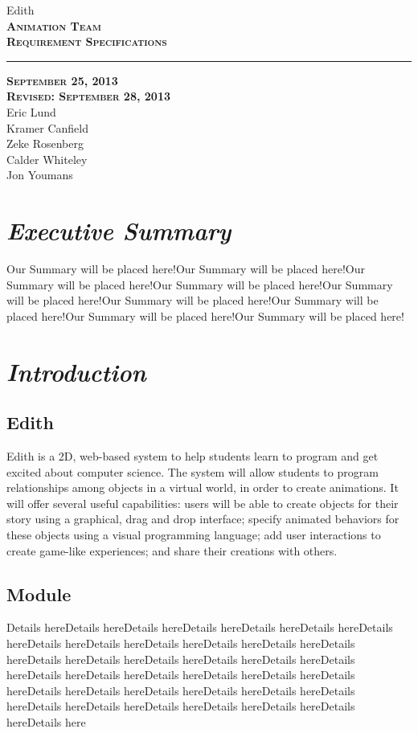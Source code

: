 \documentclass[12pt]{article}
\begin{document}
\begin{titlepage}
	\begin{center}
	\huge  Edith \\
	\vspace*{\fill}%
 	\huge \textsc{\textbf{Animation Team \\Requirement Specifications} }	
	\bigskip 
	\rule{130mm}{.1pt}
	\textsc{\textbf{September 25, 2013 \\ Revised: September 28, 2013} \\ }	
	\vspace*{\fill}%
	Eric Lund \\
	Kramer Canfield \\ 
	Zeke Rosenberg \\
	Calder Whiteley \\
	Jon Youmans
	\end{center}
	\end{titlepage}


\section{\emph{Executive Summary}}
Our Summary will be placed here!Our Summary will be placed here!Our Summary will be placed here!Our Summary will be placed here!Our Summary will be placed here!Our Summary will be placed here!Our Summary will be placed here!Our Summary will be placed here!Our Summary will be placed here!


\section{\emph{Introduction}}%
	\subsection{Edith}
         Edith is a 2D, web-based system to help students learn to program and get excited about computer science. The system will allow students to program relationships among objects in a virtual world, in order to create animations. It will offer several useful capabilities: users will be able to create objects for their story using a graphical, drag and drop interface; specify animated behaviors for these objects using a visual programming language; add user interactions to create game-like experiences; and share their creations with others. 
	\subsection{Module}
	Details hereDetails hereDetails hereDetails hereDetails hereDetails hereDetails hereDetails hereDetails hereDetails hereDetails hereDetails hereDetails hereDetails hereDetails hereDetails hereDetails hereDetails hereDetails hereDetails hereDetails hereDetails hereDetails hereDetails hereDetails hereDetails hereDetails hereDetails hereDetails hereDetails hereDetails hereDetails hereDetails hereDetails hereDetails hereDetails hereDetails hereDetails here
\end{document}
